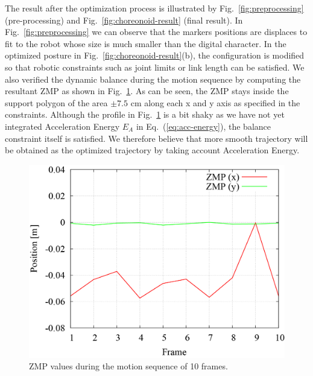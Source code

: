 \documentclass[letterpaper, 10 pt, conference]{ieeeconf}  %
\begin{document}
The result after the optimization process is illustrated by
Fig.~\ref{fig:preprocessing} (pre-processing) and
Fig.~\ref{fig:choreonoid-result} (final result).
In Fig.~\ref{fig:preprocessing} we can observe that the markers
positions are displaces to fit to the robot whose size is much smaller
than the digital character.
In the optimized posture in
Fig.~\ref{fig:choreonoid-result}(b), the configuration is modified so
that robotic constraints such as joint limits or link length can be satisfied.
We also verified the dynamic balance during the motion sequence by
computing the resultant ZMP as shown in Fig.~\ref{fig:zmp}.
As can be seen, the ZMP stays inside the support polygon of
the area $\pm 7.5$ cm along each x and y axis as specified in the
constraints. 
Although the profile in Fig.~\ref{fig:zmp} is a bit shaky
as we have not yet integrated Acceleration Energy 
$E_A$ in Eq.~(\ref{eq:acc-energy}), the balance constraint itself is
satisfied. 
We therefore believe that more smooth trajectory will be obtained as
the optimized trajectory by taking account Acceleration Energy.




\begin{figure}[t]
  \begin{center}
    \includegraphics[width=0.95 \linewidth]{figure/zmp-130719}
    \end{center}
  \caption{ZMP values during the motion sequence of 10 frames.}
  \label{fig:zmp}
\end{figure}

%
%
%
%
%
\end{document}
